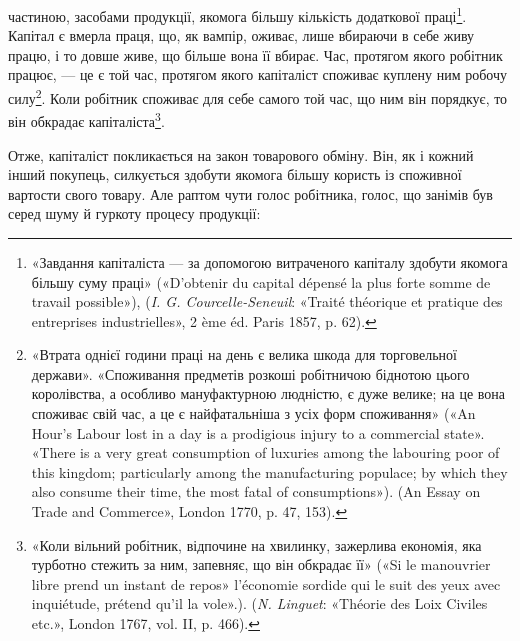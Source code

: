 \parcont{}  %
частиною, засобами продукції, якомога більшу кількість додаткової
праці\footnote{
«Завдання капіталіста — за допомогою витраченого капіталу здобути
якомога більшу суму праці» («D’obtenir du capital dépensé la
plus forte somme de travail possible»), (\emph{I. G. Courcelle-Seneuil}: «Traité
théorique et pratique des entreprises industrielles», 2 ème éd. Paris 1857,
p. 62).
}. Капітал є вмерла праця, що, як вампір, оживає,
лише вбираючи в себе живу працю, і то довше живе, що більше
вона її вбирає. Час, протягом якого робітник працює, — це є
той час, протягом якого капіталіст споживає куплену ним робочу
силу\footnote{
«Втрата однієї години праці на день є велика шкода для торговельної
держави». «Споживання предметів розкоші робітничою біднотою цього
королівства, а особливо мануфактурною людністю, є дуже велике; на це
вона споживає свій час, а це є найфатальніша з усіх форм споживання»
(«An Hour’s Labour lost in a day is a prodigious injury to a commercial
state». «There is a very great consumption of luxuries among the labouring
poor of this kingdom; particularly among the manufacturing populace; by
which they also consume their time, the most fatal of consumptions»). (An
Essay on Trade and Commerce», London 1770, p. 47, 153).
}. Коли робітник споживає для себе самого той час, що ним
він порядкує, то він обкрадає капіталіста\footnote{
«Коли вільний робітник, відпочине на хвилинку, зажерлива економія,
яка турботно стежить за ним, запевняє, що він обкрадає її» («Si le
manouvrier libre prend un instant de repos» l’économie sordide qui le suit
des yeux avec inquiétude, prétend qu’il la vole».). (\emph{N. Linguet}: «Théorie
des Loix Civiles etc.», London 1767, vol. II, p. 466).
}.

Отже, капіталіст покликається на закон товарового обміну.
Він, як і кожний інший покупець, силкується здобути якомога
більшу користь із споживної вартости свого товару. Але раптом
чути голос робітника, голос, що занімів був серед шуму й гуркоту
процесу продукції:

